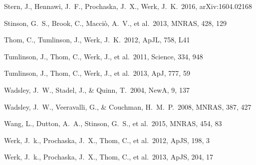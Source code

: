 \documentclass[useAMS,usenatbib]{mn2e}
\def \apj {ApJ}
\def \apjl {ApJL}
\def \mnras {MNRAS}
\def \apjs {ApJS}
\def \na {NewA}
\begin{document}
\begin{thebibliography}{}
Stern, J., Hennawi, J.~F., Prochaska, J.~X., Werk, J.~K.\ 2016, arXiv:1604.02168

 Stinson, G.~S., Brook, 
C., Macci{\`o}, A.~V., et al.\ 2013, \mnras, 428, 129 




Thom, C., Tumlinson, J., Werk, J.~K.\ 2012, \apjl, 758, L41

 Tumlinson, J., Thom, C., Werk, J., et al.\ 2011, Science, 334, 948

 Tumlinson, J., Thom, C., Werk, J., et al.\ 2013, \apj, 777, 59





 Wadsley, J.~W., Stadel, 
J., \& Quinn, T.\ 2004, \na, 9, 137 

 Wadsley, J.~W., 
Veeravalli, G., \& Couchman, H.~M.~P.\ 2008, \mnras, 387, 427 

 Wang, L., Dutton, A.~A.,  Stinson, G.~S., et al.\ 2015, \mnras, 454, 83
  
 Werk, J.~k., Prochaska, J.~X., Thom, C., et al.\ 2012, \apjs, 198, 3

 Werk, J.~k., Prochaska, J.~X., Thom, C., et al.\ 2013, \apjs, 204, 17


\end{thebibliography}
\end{document}
